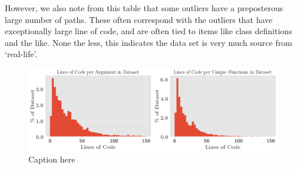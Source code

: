 However, we also note from this table that some outliers have a preposterous large number of paths. These often correspond with the outliers that have exceptionally large line of code, and are often tied to items like class definitions and the like. None the less, this indicates the data set is very much source from `real-life'.



\begin{figure}[tb]
    \centering
    \includegraphics[width=\linewidth]{ImagesCodeRelated/lines_of_code.png}
    \caption{Caption here}
    \label{fig:loc}
\end{figure}



